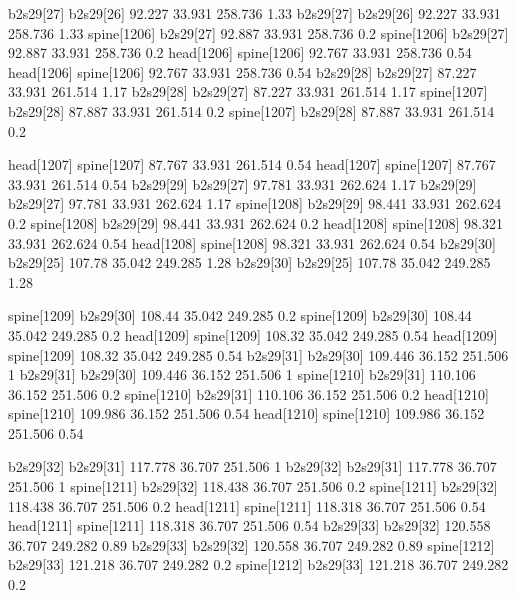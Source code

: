 b2s29[27]    b2s29[26]    92.227    33.931    258.736    1.33
b2s29[27]    b2s29[26]    92.227    33.931    258.736    1.33
spine[1206]    b2s29[27]    92.887    33.931    258.736    0.2
spine[1206]    b2s29[27]    92.887    33.931    258.736    0.2
head[1206]    spine[1206]    92.767    33.931    258.736    0.54
head[1206]    spine[1206]    92.767    33.931    258.736    0.54
b2s29[28]    b2s29[27]    87.227    33.931    261.514    1.17
b2s29[28]    b2s29[27]    87.227    33.931    261.514    1.17
spine[1207]    b2s29[28]    87.887    33.931    261.514    0.2
spine[1207]    b2s29[28]    87.887    33.931    261.514    0.2


head[1207]    spine[1207]    87.767    33.931    261.514    0.54
head[1207]    spine[1207]    87.767    33.931    261.514    0.54
b2s29[29]    b2s29[27]    97.781    33.931    262.624    1.17
b2s29[29]    b2s29[27]    97.781    33.931    262.624    1.17
spine[1208]    b2s29[29]    98.441    33.931    262.624    0.2
spine[1208]    b2s29[29]    98.441    33.931    262.624    0.2
head[1208]    spine[1208]    98.321    33.931    262.624    0.54
head[1208]    spine[1208]    98.321    33.931    262.624    0.54
b2s29[30]    b2s29[25]    107.78    35.042    249.285    1.28
b2s29[30]    b2s29[25]    107.78    35.042    249.285    1.28


spine[1209]    b2s29[30]    108.44    35.042    249.285    0.2
spine[1209]    b2s29[30]    108.44    35.042    249.285    0.2
head[1209]    spine[1209]    108.32    35.042    249.285    0.54
head[1209]    spine[1209]    108.32    35.042    249.285    0.54
b2s29[31]    b2s29[30]    109.446    36.152    251.506    1
b2s29[31]    b2s29[30]    109.446    36.152    251.506    1
spine[1210]    b2s29[31]    110.106    36.152    251.506    0.2
spine[1210]    b2s29[31]    110.106    36.152    251.506    0.2
head[1210]    spine[1210]    109.986    36.152    251.506    0.54
head[1210]    spine[1210]    109.986    36.152    251.506    0.54


b2s29[32]    b2s29[31]    117.778    36.707    251.506    1
b2s29[32]    b2s29[31]    117.778    36.707    251.506    1
spine[1211]    b2s29[32]    118.438    36.707    251.506    0.2
spine[1211]    b2s29[32]    118.438    36.707    251.506    0.2
head[1211]    spine[1211]    118.318    36.707    251.506    0.54
head[1211]    spine[1211]    118.318    36.707    251.506    0.54
b2s29[33]    b2s29[32]    120.558    36.707    249.282    0.89
b2s29[33]    b2s29[32]    120.558    36.707    249.282    0.89
spine[1212]    b2s29[33]    121.218    36.707    249.282    0.2
spine[1212]    b2s29[33]    121.218    36.707    249.282    0.2



